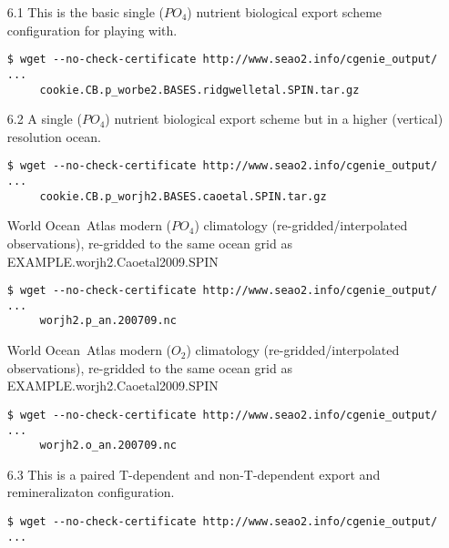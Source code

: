 \begin{itemize}[noitemsep]
\vspace{2mm}
\item [6.1] This is the basic single (\(PO_{4}\)) nutrient biological export scheme configuration for playing with.
\vspace{-2mm}\small\begin{verbatim}
$ wget --no-check-certificate http://www.seao2.info/cgenie_output/ ...
     cookie.CB.p_worbe2.BASES.ridgwelletal.SPIN.tar.gz
\end{verbatim}\normalsize\vspace{-1mm}
\vspace{2mm}
\item [6.2] A single (\(PO_{4}\)) nutrient biological export scheme but in a higher (vertical) resolution ocean.
\vspace{-1mm}\small\begin{verbatim}
$ wget --no-check-certificate http://www.seao2.info/cgenie_output/ ...
     cookie.CB.p_worjh2.BASES.caoetal.SPIN.tar.gz
\end{verbatim}\normalsize\vspace{-1mm}
World Ocean\ Atlas modern (\(PO_{4}\)) climatology (re-gridded/interpolated observations), re-gridded to the same ocean grid as \textsf{\footnotesize EXAMPLE.worjh2.Caoetal2009.SPIN}
\vspace{-1mm}\small\begin{verbatim}
$ wget --no-check-certificate http://www.seao2.info/cgenie_output/ ...
     worjh2.p_an.200709.nc
\end{verbatim}\normalsize\vspace{-1mm}
World Ocean\ Atlas modern (\(O_{2}\)) climatology (re-gridded/interpolated observations), re-gridded to the same ocean grid as \textsf{\footnotesize EXAMPLE.worjh2.Caoetal2009.SPIN}
\vspace{-1mm}\small\begin{verbatim}
$ wget --no-check-certificate http://www.seao2.info/cgenie_output/ ...
     worjh2.o_an.200709.nc
\end{verbatim}\normalsize\vspace{-1mm}
\vspace{2mm}
\item [6.3] This is a paired T-dependent and non-T-dependent export and remineralizaton configuration.
\vspace{-1mm}\small \begin{verbatim}
$ wget --no-check-certificate http://www.seao2.info/cgenie_output/ ...

\end{verbatim}
\end{itemize}
